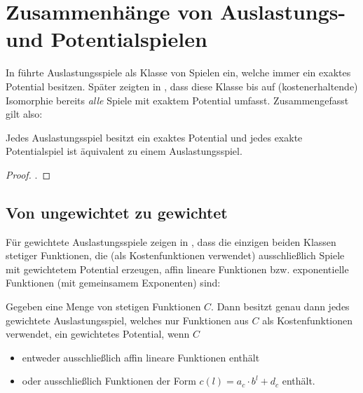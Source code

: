 \section{Zusammenhänge von Auslastungs- und Potentialspielen}\label{sec:Auslastungsspiele}


In \cite{RosenthalPotential} führte \citeauthor{RosenthalPotential} Auslastungsspiele als Klasse von Spielen ein, welche immer ein exaktes Potential besitzen. Später zeigten \citeauthor{MonShap} in \cite[Theorem 3.2]{MonShap}, dass diese Klasse bis auf (kostenerhaltende) Isomorphie bereits \emph{alle} Spiele mit exaktem Potential umfasst. Zusammengefasst gilt also:

\begin{satz}\label{satz:MondererShapley}
	Jedes Auslastungsspiel besitzt ein exaktes Potential und jedes exakte Potentialspiel ist äquivalent zu einem Auslastungsspiel.
\end{satz}

\begin{proof}.
	
\end{proof}

\subsection{Von ungewichtet zu gewichtet}

Für gewichtete Auslastungsspiele zeigen \citeauthor{CharExGewPotinWCG} in \cite[Theorem 3.9]{CharExGewPotinWCG}, dass die einzigen beiden Klassen stetiger Funktionen, die (als Kostenfunktionen verwendet) ausschließlich Spiele mit gewichtetem Potential erzeugen, affin lineare Funktionen bzw. exponentielle Funktionen (mit gemeinsamem Exponenten) sind:

\begin{satz}\label{satz:CharExGewPotinWCG}
	Gegeben eine Menge von stetigen Funktionen $C$. Dann besitzt genau dann jedes gewichtete Auslastungsspiel, welches nur Funktionen aus $C$ als Kostenfunktionen verwendet, ein gewichtetes Potential, wenn $C$
	\begin{itemize}
		\item entweder ausschließlich affin lineare Funktionen enthält
		\item oder ausschließlich Funktionen der Form $c(l) = a_c\cdot b^l + d_c$ enthält.
	\end{itemize}
\end{satz}

